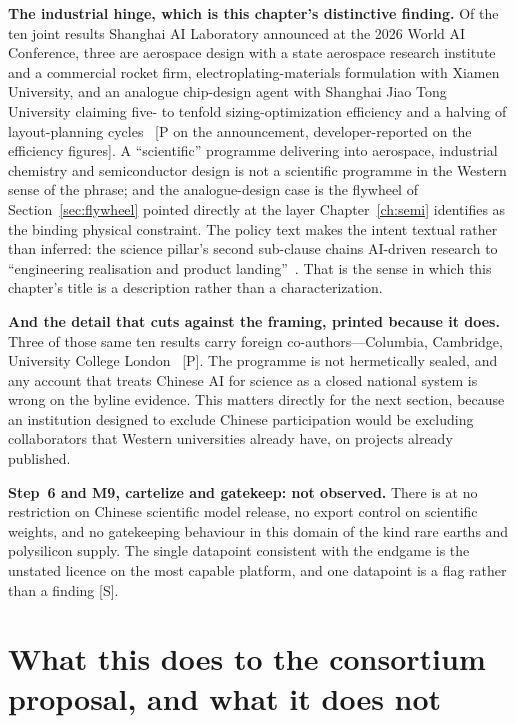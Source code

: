 \textbf{The industrial hinge, which is this chapter's distinctive finding.} Of the ten joint results Shanghai AI Laboratory announced at the 2026 World AI Conference, three are aerospace design with a state aerospace research institute and a commercial rocket firm, electroplating-materials formulation with Xiamen University, and an analogue chip-design agent with Shanghai Jiao Tong University claiming five- to tenfold sizing-optimization efficiency and a halving of layout-planning cycles~\cite{ai4s-industrial} [P on the announcement, developer-reported on the efficiency figures]. A ``scientific'' programme delivering into aerospace, industrial chemistry and semiconductor design is not a scientific programme in the Western sense of the phrase; and the analogue-design case is the flywheel of Section~\ref{sec:flywheel} pointed directly at the layer Chapter~\ref{ch:semi} identifies as the binding physical constraint. The policy text makes the intent textual rather than inferred: the science pillar's second sub-clause chains AI-driven research to ``engineering realisation and product landing''~\cite{ai-plus-science}. That is the sense in which this chapter's title is a description rather than a characterization.

\textbf{And the detail that cuts against the framing, printed because it does.} Three of those same ten results carry foreign co-authors---Columbia, Cambridge, University College London~\cite{ai4s-industrial} [P]. The programme is not hermetically sealed, and any account that treats Chinese AI for science as a closed national system is wrong on the byline evidence. This matters directly for the next section, because an institution designed to exclude Chinese participation would be excluding collaborators that Western universities already have, on projects already published.

\textbf{Step~6 and M9, cartelize and gatekeep: not observed.} There is at \datafreeze no restriction on Chinese scientific model release, no export control on scientific weights, and no gatekeeping behaviour in this domain of the kind rare earths and polysilicon supply. The single datapoint consistent with the endgame is the unstated licence on the most capable platform, and one datapoint is a flag rather than a finding [S].

\section{What this does to the consortium proposal, and what it does not}
\label{sec:china-ai4s-consortium}

